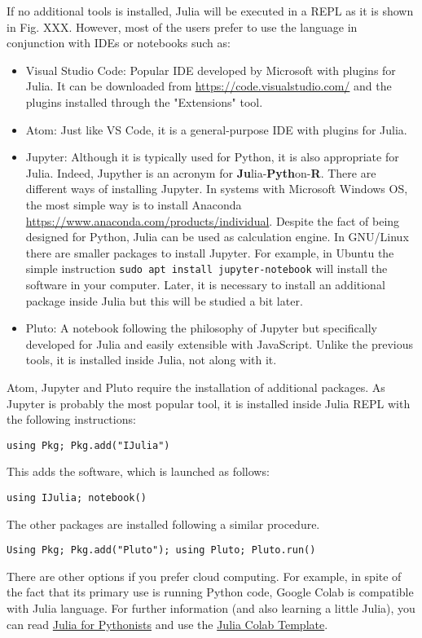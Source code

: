 If no additional tools is installed, Julia will be executed in a REPL as it is shown in Fig. XXX. However, most of the users prefer to use the language in conjunction with IDEs or notebooks such as:
\begin{itemize}
	\item Visual Studio Code: Popular IDE developed by Microsoft with plugins for Julia. It can be downloaded from \href{https://code.visualstudio.com/}{https://code.visualstudio.com/} and the plugins installed through the "Extensions" tool.
	\item Atom: Just like VS Code, it is a general-purpose IDE with plugins for Julia.
	\item Jupyter: Although it is typically used for Python, it is also appropriate for Julia. Indeed, Jupyther is an acronym for \textbf{Ju}lia-\textbf{Pyth}on-\textbf{R}. There are different ways of installing Jupyter. In systems with Microsoft Windows OS, the most simple way is to install Anaconda \href{https://www.anaconda.com/products/individual}{https://www.anaconda.com/products/individual}. Despite the fact of being designed for Python, Julia can be used as calculation engine. In GNU/Linux there are smaller packages to install Jupyter. For example, in Ubuntu the simple instruction \texttt{sudo apt install jupyter-notebook} will install the software in your computer. Later, it is necessary to install an additional package inside Julia but this will be studied a bit later.
	\item Pluto: A notebook following the philosophy of Jupyter but specifically developed for Julia and easily extensible with JavaScript. Unlike the previous tools, it is installed inside Julia, not along with it. 
\end{itemize}
%
Atom, Jupyter and Pluto require the installation of additional packages. As Jupyter is probably the most popular tool, it is installed inside Julia REPL with the following instructions:

\texttt{using Pkg; Pkg.add("IJulia")}

This adds the software, which is launched as follows:

\texttt{using IJulia; notebook()} 

The other packages are installed following a similar procedure. 

\texttt{Using Pkg; Pkg.add("Pluto"); using Pluto; Pluto.run()}

There are other options if you prefer cloud computing. For  example, in spite of the fact that its primary use is running Python code, Google Colab is compatible with Julia language. For further information (and also learning a little Julia), you can read \href{https://colab.research.google.com/github/ageron/julia_notebooks/blob/master/Julia_for_Pythonistas.ipynb#scrollTo=GIeFXS0F0zww}{Julia for Pythonists} and use the \href{https://colab.research.google.com/github/ageron/julia_notebooks/blob/master/Julia_Colab_Notebook_Template.ipynb}{Julia Colab Template}.

